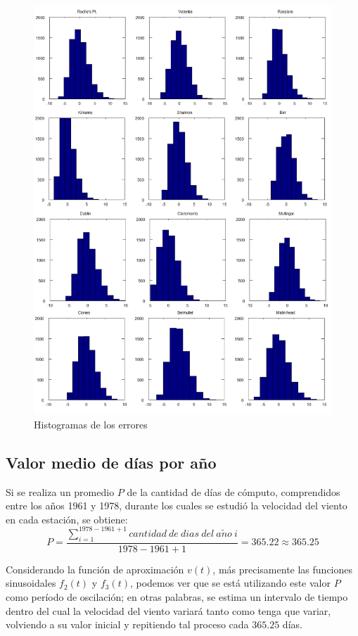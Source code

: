 \documentclass[journal, monochrome]{IEEEtran}
\begin{document}
\begin{figure}[hbp]
	\centering
	\includegraphics[scale = 0.35]{img/histo.png}
	\caption{Histogramas de los errores}
	\label{figure:histograms}
\end{figure}




\vspace{0.5cm}
\subsection{Valor medio de días por año}
Si se realiza un promedio $P$ de la cantidad de días de cómputo, comprendidos entre los años 1961 y 1978, durante los cuales se estudió la velocidad del viento en cada estación, se obtiene:
\begin{equation}
 P = \frac{\displaystyle\sum_{i=1}^{1978-1961+1} cantidad \: de \: dias \: del \: a\tilde{n}o \: i}{1978-1961+1} = 365.22 \approx 365.25
\end{equation}
\par
Considerando la función de aproximación $v(t)$, más precisamente las funciones sinusoidales $f_2(t)$ y $f_3(t)$, podemos ver que se está utilizando
este valor $P$ como período de oscilación; en otras palabras, se estima un intervalo de tiempo dentro del cual la velocidad del viento variará tanto
como tenga que variar, volviendo a su valor inicial y repitiendo tal proceso cada $365.25$ días.
\end{document}
